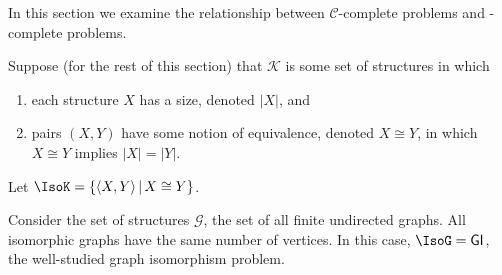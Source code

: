 In this section we examine the relationship between $\mathcal{C}$-complete problems and \CEq-complete problems.

Suppose (for the rest of this section) that $\mathcal{K}$ is some set of structures in which
\begin{enumerate}
\item each structure $X$ has a size, denoted $|X|$, and
\item pairs $(X, Y)$ have some notion of equivalence, denoted $X\cong Y$, in which $X\cong Y$ implies $|X|=|Y|$.
\end{enumerate}
Let $\IsoK=\lb\pair{X}{Y}\st X\cong Y\rb$.
\begin{example}
  Consider the set of structures $\mathcal{G}$, the set of all finite undirected graphs.
  All isomorphic graphs have the same number of vertices.
  In this case, $\IsoG=\GI$, the well-studied graph isomorphism problem.
\end{example}


